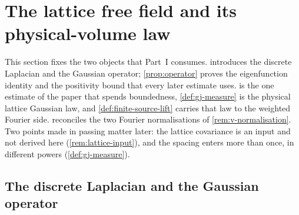%
\section{The lattice free field and its physical-volume law}\label{sec:lattice}

This section fixes the two objects that Part~I consumes.  introduces the
discrete Laplacian and the Gaussian operator; \cref{prop:operator} proves the eigenfunction identity and
the positivity bound that every later estimate uses.  is the one estimate of the
paper that spends boundedness, \cref{def:gj-measure} is the physical lattice Gaussian law, and
\cref{def:finite-source-lift} carries that law to the weighted Fourier side. 
reconciles the two Fourier normalisations of \cref{rem:v-normalisation}. Two points made in passing matter
later: the lattice covariance is an input and not derived here (\cref{rem:lattice-input}), and the spacing
enters more than once, in different powers (\cref{def:gj-measure}).

\subsection{The discrete Laplacian and the Gaussian operator}

